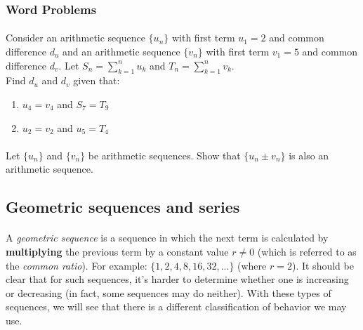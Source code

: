 \documentclass[12pt, a4paper, titlepage, twoside]{article}
\begin{document}
	\subsubsection*{Word Problems}
	
	\paragraph{}
	 Consider an arithmetic sequence $\{u_n\}$ with first term $u_1 = 2$ and common difference 
	$d_u$ and an arithmetic sequence $\{v_n\}$ with first term $v_1 = 5$ and common difference $d_v$. 
	Let $S_n = \displaystyle \sum_{k=1}^n u_k$ and $T_n = \displaystyle \sum_{k=1}^n v_k$.\\
	
	Find $d_u$ and $d_v$ given that:
	
	\begin{multicols}{2}
		\begin{enumerate}[label=\textbf{(\alph*)}]
			\item $u_4 = v_4$ and $S_7 = T_9$
			\item $u_2 = v_2$ and $u_5 = T_4$
		\end{enumerate}
	\end{multicols}
	
	\paragraph{}
	 Let $\{u_n\}$ and $\{v_n\}$ be arithmetic sequences. Show that $\{u_n \pm v_n\}$ is also an 
	arithmetic sequence.
	
	\hfill
	
	\subsection{Geometric sequences and series}
	
	\paragraph{}
	A \textit{geometric sequence} is a sequence in which the next term is calculated by \textbf{multiplying} the previous
	term by a constant value $r \neq 0$ (which is referred to as the \textit{common ratio}). For example: $\{1, 2, 4, 8, 16, 32,...\}$ 
	(where $r=2$). It should be clear that for such
	sequences, it's harder to determine whether one is increasing or decreasing (in fact, some sequences may do neither). With these
	types of sequences, we will see that there is a different classification of behavior we may use.
	
\end{document}
